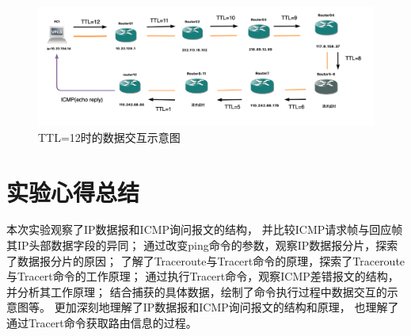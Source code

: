 \documentclass[a4paper,12pt]{report}
\begin{document}
\begin{spacing}{1.5}
\begin{figure}[htb!]
  \centering
\includegraphics[width=16cm]{figure/ttl-12.png}
\caption{TTL=12时的数据交互示意图}
\label{pic:ttl12}
\end{figure}


\section{实验心得总结}
本次实验观察了IP数据报和ICMP询问报文的结构，
并比较ICMP请求帧与回应帧其IP头部数据字段的异同；
通过改变ping命令的参数，观察IP数据报分片，探索了数据报分片的原因；
了解了Traceroute与Tracert命令的原理，探索了Traceroute与Tracert命令的工作原理；
通过执行Tracert命令，观察ICMP差错报文的结构，并分析其工作原理；
结合捕获的具体数据，绘制了命令执行过程中数据交互的示意图等。
更加深刻地理解了IP数据报和ICMP询问报文的结构和原理，
也理解了通过Tracert命令获取路由信息的过程。

\end{spacing}
\end{document}
